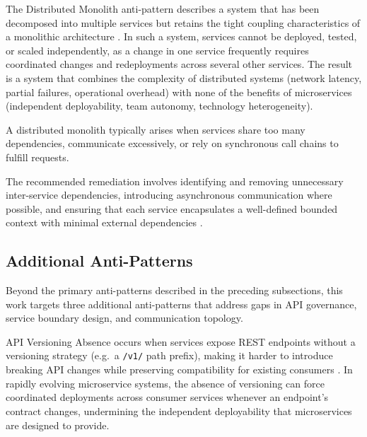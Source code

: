 \par The Distributed Monolith anti-pattern describes a system that has been decomposed into multiple services but retains the tight coupling characteristics of a monolithic architecture \cite{Newman2015}. In such a system, services cannot be deployed, tested, or scaled independently, as a change in one service frequently requires coordinated changes and redeployments across several other services. The result is a system that combines the complexity of distributed systems (network latency, partial failures, operational overhead) with none of the benefits of microservices (independent deployability, team autonomy, technology heterogeneity).

A distributed monolith typically arises when services share too many dependencies, communicate excessively, or rely on synchronous call chains to fulfill requests.


The recommended remediation involves identifying and removing unnecessary inter-service dependencies, introducing asynchronous communication where possible, and ensuring that each service encapsulates a well-defined bounded context with minimal external dependencies \cite{Richardson2018}.

\subsection{Additional Anti-Patterns}
\label{subsec:anti-patterns-summary}

\par Beyond the primary anti-patterns described in the preceding subsections, this work targets three additional anti-patterns that address gaps in API governance, service boundary design, and communication topology.

\par API Versioning Absence occurs when services expose REST endpoints without a versioning strategy (e.g.\ a \texttt{/v1/} path prefix), making it harder to introduce breaking API changes while preserving compatibility for existing consumers \cite{Taibi2018, Walker2020}. In rapidly evolving microservice systems, the absence of versioning can force coordinated deployments across consumer services whenever an endpoint's contract changes, undermining the independent deployability that microservices are designed to provide.

